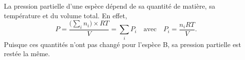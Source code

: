 
\begin{corrige}
La pression partielle d'une espèce dépend de sa quantité de matière, sa température et du volume total. 
En effet, 
\[
P=\frac{\Big (\displaystyle\sum_i {n_i}\Big )\times RT}{V}=\sum_i P_i
\quad\text{avec}\quad
P_i=\frac{n_iRT}{V}.
\]
Puisque ces quantités n'ont pas changé pour l'espèce B, sa pression partielle est restée la même.
\end{corrige}



\finEntrainement





\afficheReponsesMelangees

\finFicheEntrainement                                                                        %


\ifdefined\mainIsLoaded\else
\printReponsesEtCorriges
\fi
